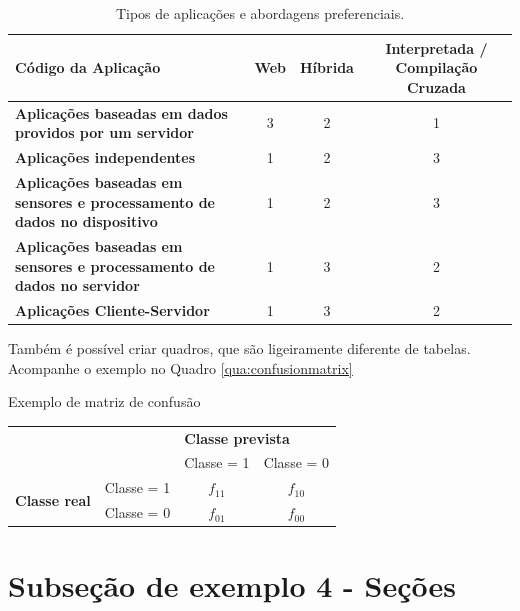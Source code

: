 \begin{table}[!htb]
	\centering
	\caption{\label{tab:crossplatform} Tipos de aplicações e abordagens preferenciais.}
	\begin{adjustbox}{max width=\textwidth}
		\begin{tabular}{@{} p{5cm} ccc @{}}
		\toprule
		\textbf{Código da Aplicação} & \textbf{Web} & \textbf{Híbrida} & \textbf{Interpretada / Compilação Cruzada} \\ \hline

		\textbf{Aplicações baseadas em dados providos por um servidor} &
			3 & 2 & 1
		\\ \hline

		\textbf{Aplicações independentes} & 1 & 2 & 3\\ \hline

		\textbf{Aplicações baseadas em sensores e processamento de dados no dispositivo} & 1 & 2 & 3\\ \hline

		\textbf{Aplicações baseadas em sensores e processamento de dados no servidor} & 1 & 3 & 2\\ \hline

		\textbf{Aplicações Cliente-Servidor} & 1 & 3 & 2 \\ \bottomrule
	\end{tabular}
	\end{adjustbox}
\end{table}

Também é possível criar quadros, que são ligeiramente diferente de tabelas. Acompanhe o exemplo no Quadro \ref{qua:confusionmatrix}

\begin{quadro}
	\centering
	\caption{\label{qua:confusionmatrix}Exemplo de matriz de confusão}
	\begin{tabular}{ll|c|c|}
		\cline{3-4}
		\multicolumn{1}{c}{\textbf{}} & \multicolumn{1}{c|}{\textbf{}} & \multicolumn{2}{l|}{\textbf{Classe prevista}} \\ \cline{3-4}
		 & \multicolumn{1}{c|}{\textbf{}} & Classe = 1 & Classe = 0 \\ \hline
		\multicolumn{1}{|l|}{\multirow{2}{*}{\textbf{Classe real}}} & Classe = 1 & $f_{11}$ & $f_{10}$ \\ \cline{2-4}
		\multicolumn{1}{|l|}{} & Classe = 0 & $f_{01}$ & $f_{00}$ \\ \hline
	\end{tabular}
	\Ididthis
\end{quadro}

\section{Subseção de exemplo 4 - Seções}